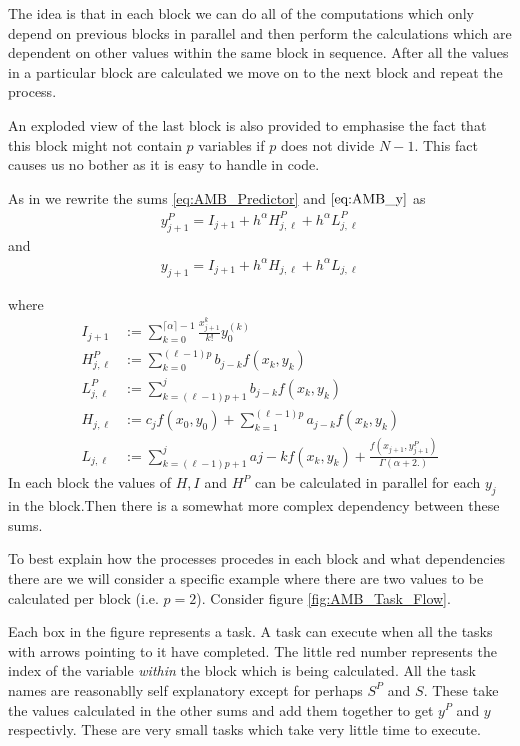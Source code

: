 The idea is that in each block we can do all of the computations which only depend on previous blocks in parallel and then perform the calculations which are dependent on other values within the same block in sequence. After all the values in a particular block are calculated we move on to the next block and repeat the process.

An exploded view of the last block is also provided to emphasise the fact that this block might not contain $ p $ variables if $ p $ does not divide $ N - 1 $. This fact causes us no bother as it is easy to handle in code.

As in \cite{Diethelm2011} we rewrite the sums \eqref{eq:AMB_Predictor} and $ \eqref{eq:AMB_y} $ as 
\begin{align}
    y_{j+1}^P = I_{j+1} + h^\alpha H_{j,\ell}^P + h^\alpha L_{j,\ell}^P
\end{align}
and
\begin{align}
    y_{j+1} = I_{j+1} + h^{\alpha} H_{j,\ell} + h^\alpha L_{j,\ell}
\end{align}

where 
\begin{align}
    I_{j+1}         & := \sum_{k=0}^{\lceil \alpha \rceil -1} \frac{x_{j+1}^k}{k!} y_0^{(k)} \\
    H^P_{j,\ell}    & := \sum_{k=0}^{(\ell-1)p} b_{j-k} f(x_k, y_k) \\
    L_{j,\ell}^P    & := \sum_{k=(\ell-1)p+1}^{j} b_{j-k} f(x_k,y_k) \\
    H_{j,\ell}      & := c_j f(x_0, y_0) + \sum_{k=1}^{(\ell - 1)p} a_{j-k}f(x_k, y_k) \\
    L_{j,\ell}      & := \sum_{k=(\ell-1)p + 1}^j a{j-k} f(x_k, y_k) + \frac{f(x_{j+1}, y^P_{j+1})}{\Gamma(\alpha + 2.)}
\end{align}
In each block the values of $ H, I $ and $ H^P $ can be calculated in parallel for each $ y_j $ in the block.Then there is a somewhat more complex dependency between these sums. 

To best explain how the processes procedes in each block and what dependencies there are we will consider a specific example where there are two values to be calculated per block (i.e. $ p = 2 $). Consider figure \ref{fig:AMB_Task_Flow}. 

Each box in the figure represents a task. A task can execute when all the tasks with arrows pointing to it have completed. The little red number represents the index of the variable \emph{within} the block which is being calculated. All the task names are reasonablly self explanatory except for perhaps $ S^P $ and $ S $. These take the values calculated in the other sums and add them together to get $ y^P $ and $ y $ respectivly. These are very small tasks which take very little time to execute.

